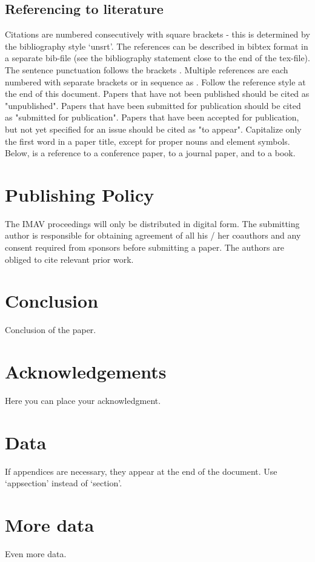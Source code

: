 \documentclass{article}
\begin{document}
\subsection{Referencing to literature}
 Citations are numbered consecutively with square brackets \cite{DEWAGTER2014} - this is determined by the bibliography style `unsrt'. The references can be described in bibtex format in a separate bib-file (see the bibliography statement close to the end of the tex-file).  The sentence punctuation follows the brackets \cite{NOLFIPOWLIM}. Multiple references \cite{DEWAGTER2014,NOLFIPOWLIM} are each numbered with separate brackets or in sequence as \cite{DEWAGTER2014,NOLFIPOWLIM,BISHOP2006}.
Follow the reference style at the end of this document. Papers that have not been published should be cited as "unpublished". Papers that have been submitted for publication should be cited as "submitted for publication". Papers that have been accepted for publication, but not yet specified for an issue should be cited as "to appear". Capitalize only the first word in a paper title, except for proper nouns and element symbols.
Below, \cite{DEWAGTER2014} is a reference to a conference paper, \cite{NOLFIPOWLIM} to a journal paper, and \cite{BISHOP2006} to a book.

\section{Publishing Policy}
The IMAV proceedings will only be distributed in digital form. The submitting author is responsible for obtaining agreement of all his / her coauthors and any consent required from sponsors before submitting a paper. The authors are obliged to cite relevant prior work.

\section{Conclusion}
Conclusion of the paper.

\section*{Acknowledgements}
Here you can place your acknowledgment.




\appendix
\newcommand{\appsection}[1]{\let\oldthesection\thesection
  \renewcommand{\thesection}{Appendix \oldthesection:}
  \section{#1}\let\thesection\oldthesection}

\appsection{Data}
If appendices are necessary, they appear at the end of the document. Use `appsection' instead of `section'.
\appsection{More data}
Even more data.
\end{document}
